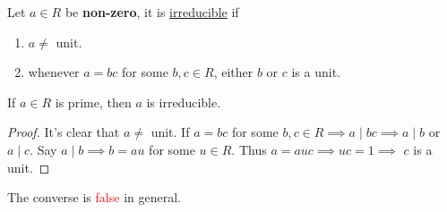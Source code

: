 \begin{definition}
	Let \( a\in R \) be \textbf{non-zero}, it is \underline{irreducible} if
	\begin{enumerate}
		\item \( a \ne \) unit.
		\item whenever \( a=bc \) for some \( b,c \in R \), either \( b \) or \( c \) is a unit.
	\end{enumerate}
\end{definition}

\begin{proposition}
	If \( a\in R \) is prime, then \( a \) is irreducible.
\end{proposition}

\begin{proof}
	It's clear that \( a \ne \) unit. If \( a =bc \) for some \( b,c \in R \implies a\mid bc \implies a\mid b\) or \( a\mid c \). Say \( a\mid b\implies b=au \) for some \( u\in R \). Thus \( a=auc \implies uc = 1 \implies \) \( c \) is a unit.
\end{proof}

\begin{remark}
	The converse is \textcolor{red}{false} in general.
\end{remark}


